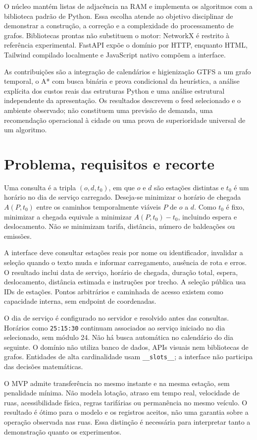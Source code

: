 \documentclass[12pt]{article}
\newcommand{\code}[1]{\texttt{#1}}
\begin{document}
O núcleo mantém listas de adjacência na RAM e implementa os algoritmos com a biblioteca padrão de Python. Essa escolha atende ao objetivo disciplinar de demonstrar a construção, a correção e a complexidade do processamento de grafos. Bibliotecas prontas não substituem o motor: NetworkX é restrito à referência experimental. FastAPI expõe o domínio por HTTP, enquanto HTML, Tailwind compilado localmente e JavaScript nativo compõem a interface.

As contribuições são a integração de calendários e higienização GTFS a um grafo temporal, o A* com busca binária e prova condicional da heurística, a análise explícita dos custos reais das estruturas Python e uma análise estrutural independente da apresentação. Os resultados descrevem o feed selecionado e o ambiente observado; não constituem uma previsão de demanda, uma recomendação operacional à cidade ou uma prova de superioridade universal de um algoritmo.

\section{Problema, requisitos e recorte}
Uma consulta é a tripla $(o,d,t_0)$, em que $o$ e $d$ são estações distintas e $t_0$ é um horário no dia de serviço carregado. Deseja-se minimizar o horário de chegada $A(P,t_0)$ entre os caminhos temporalmente viáveis $P$ de $o$ a $d$. Como $t_0$ é fixo, minimizar a chegada equivale a minimizar $A(P,t_0)-t_0$, incluindo espera e deslocamento. Não se minimizam tarifa, distância, número de baldeações ou emissões.

A interface deve consultar estações reais por nome ou identificador, invalidar a seleção quando o texto muda e informar carregamento, ausência de rota e erros. O resultado inclui data de serviço, horário de chegada, duração total, espera, deslocamento, distância estimada e instruções por trecho. A seleção pública usa IDs de estações. Pontos arbitrários e caminhada de acesso existem como capacidade interna, sem endpoint de coordenadas.

O dia de serviço é configurado no servidor e resolvido antes das consultas. Horários como \code{25:15:30} continuam associados ao serviço iniciado no dia selecionado, sem módulo 24. Não há busca automática no calendário do dia seguinte. O domínio não utiliza banco de dados, APIs visuais nem bibliotecas de grafos. Entidades de alta cardinalidade usam \code{\_\_slots\_\_}; a interface não participa das decisões matemáticas.

O MVP admite transferência no mesmo instante e na mesma estação, sem penalidade mínima. Não modela lotação, atraso em tempo real, velocidade de ruas, acessibilidade física, regras tarifárias ou permanência no mesmo veículo. O resultado é ótimo para o modelo e os registros aceitos, não uma garantia sobre a operação observada nas ruas. Essa distinção é necessária para interpretar tanto a demonstração quanto os experimentos.
\end{document}
